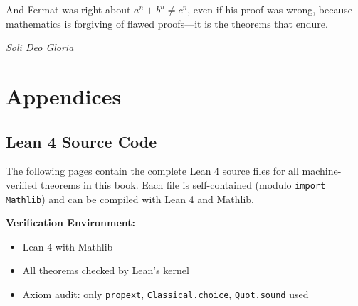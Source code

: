 \documentclass[11pt,twoside,openright]{book}
\theoremstyle{definition}
\begin{document}
And Fermat was right about $a^n + b^n \neq c^n$, even if his proof was
wrong, because mathematics is forgiving of flawed proofs---it is the
theorems that endure.

\bigskip
\begin{center}
\end{center}

\vfill
\begin{center}
\textit{Soli Deo Gloria}
\end{center}

\appendix
\part*{Appendices}

\chapter{Lean 4 Source Code}
\label{app:lean}

The following pages contain the complete Lean 4 source files for all
machine-verified theorems in this book. Each file is self-contained
(modulo \texttt{import Mathlib}) and can be compiled with Lean 4 and
Mathlib.

\bigskip

\noindent\textbf{Verification Environment:}
\begin{itemize}
\item Lean 4 with Mathlib
\item All theorems checked by Lean's kernel
\item Axiom audit: only \texttt{propext}, \texttt{Classical.choice},
  \texttt{Quot.sound} used
\end{itemize}

\bigskip


\end{document}
